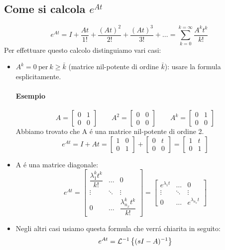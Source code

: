 \documentclass[../main.tex]{subfiles}
\begin{document}
	\subsection{Come si calcola $ e^{At} $}
		\[
			e^{At} = I + \dfrac{At}{1!} + \dfrac{(At)^2}{2!} + \dfrac{(At)^3}{3!} + \dots = \sum_{k=0}^{k=\infty} \dfrac{A^k t^k}{k!}
		\]
		Per effettuare questo calcolo distinguiamo vari casi:
		\begin{itemize}
			\item 
				$ A^k = 0\ \text{per}\ k \geq \bar k $ (matrice nil-potente di ordine $ \bar k $): usare la formula esplicitamente.
				
				\begin{mdframed}[style=Esempio]
					\paragraph{Esempio}
						\[
							A =
							\begin{bmatrix}
								0 & 1\\ 0 & 0
							\end{bmatrix}
							\qquad
							A^2 = 
							\begin{bmatrix}
								0 & 0\\ 0 & 0
							\end{bmatrix}
							\qquad
							A^k =
							\begin{bmatrix}
								0 & 1\\ 0 & 0
							\end{bmatrix}
						\]
						Abbiamo trovato che A \'e una matrice nil-potente di ordine 2.
						\[ 
							e^{At} = I + At = 
							\begin{bmatrix}
								1 & 0\\
								0 & 1
							\end{bmatrix} +
							\begin{bmatrix}
								0 & t\\
								0 & 0
							\end{bmatrix} = 
							\begin{bmatrix}
								1 & t\\
								0 & 1
							\end{bmatrix}
						\]
				\end{mdframed}
			\item
				A \'e una matrice diagonale:
				\[
					e^{At} =
					\begin{bmatrix}
						\dfrac{\lambda_1^k t^k}{k!} & \dots & 0
						\\
						\vdots & \ddots & \vdots
						\\
						0 & \dots & \dfrac{\lambda_{n_x}^k t^k}{k!}
					\end{bmatrix} = 
					\begin{bmatrix}
						e^{\lambda_1 t} & \dots & 0
						\\[0.5em]
						\vdots & \ddots & \vdots
						\\[0.5em]
						0 & \dots & e^{\lambda_{n_x} t}
					\end{bmatrix}
				\]
			\item
				Negli altri casi usiamo questa formula che verr\'a chiarita in seguito:
				\[
					e^{At} = \mathcal{L}^{-1} \left\lbrace (sI-A)^{-1} \right\rbrace
				\]
				

\end{itemize}
\end{document}
